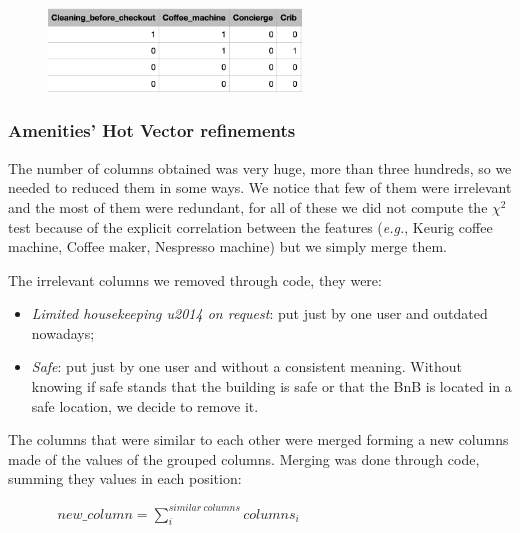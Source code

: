 \begin{figure}[H]
	\centering
	\includegraphics[width=0.6\textwidth]{img/onehot.png}  
\end{figure}

\subsubsection{Amenities' Hot Vector refinements}
The number of columns obtained was very huge, more than three hundreds, so we needed to reduced them in some ways. We notice that few of them were irrelevant and the most of them were redundant, for all of these we did not compute the $\chi^2$ test because of the explicit correlation between the features (\textit{e.g.}, Keurig coffee machine, Coffee maker, Nespresso machine) but we simply merge them.

The irrelevant columns we removed through code, they were: 
\begin{itemize}
	\item \textit{Limited housekeeping u2014 on request}: put just by one user and outdated nowadays;
	\item \textit{Safe}: put just by one user and without a consistent meaning. Without knowing if safe stands that the building is safe or that the BnB is located in a safe location, we decide to remove it.
\end{itemize}

The columns that were similar to each other were merged forming a new columns made of the values of the grouped columns. Merging was done through code, summing they values in each position:

$
	\ \ \ \	\ \ \ \	\ \ \ \	\ \ \ \		new\_column = \sum^{similar \ columns}_{i} columns_i
$

